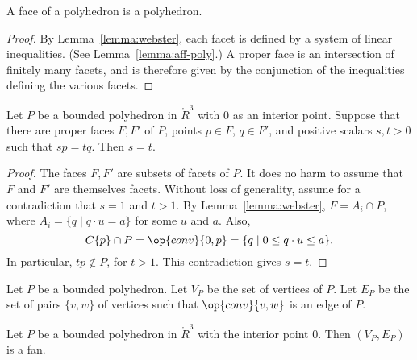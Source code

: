 \begin{corollary}
A face of a polyhedron is a polyhedron.  
\end{corollary}

\begin{proof} By Lemma~\ref{lemma:webster}, each facet is defined by a system of linear inequalities.  (See Lemma~\ref{lemma:aff-poly}.)  A proper face is an intersection of finitely many facets, and is therefore given by the conjunction of the inequalities defining the various facets.
\end{proof}


\begin{lemma} \label{lemma:scale} 
Let $P$ be a bounded polyhedron in $\ring{R}^3$ with $0$ as an interior point.  Suppose that there are proper faces $F,F'$ of $P$, points $p\in F$, $q\in F'$, and positive scalars $s,t >0$ such that $s p = t q$.  Then $s=t$.
\end{lemma}

\begin{proof}  The faces $F,F'$ are subsets of facets of $P$.  It does no harm to assume that $F$ and $F'$ are themselves facets.   Without loss of generality, assume for a contradiction that $s=1$ and $t>1$.  By Lemma~\ref{lemma:webster}, 
 $F = A_i \cap P$, where $A_i = \{q \mid q\cdot u = a\}$ for some $u$ and $a$.  Also, 
$$
C\{p\}\cap P = \op{conv}\{0,p\} = \{q \mid 0\le q\cdot u \le a\}.
$$
In particular, $t p\not\in P$, for $t>1$.  This contradiction gives $s = t$.
\end{proof}





\begin{definition} Let $P$ be a bounded polyhedron.
Let $V_P$ be the set of vertices of $P$.  Let $E_P$ be the set of pairs $\{v,w\}$ of vertices such that $\op{conv}\{v,w\}$ is an edge of $P$.
\end{definition}
%
%

\begin{lemma}\label{lemma:polyhedron}%
Let $P$ be a bounded polyhedron in $\ring{R}^3$ with the interior point $0$.
Then $(V_P,E_P)$ is a fan.
\end{lemma}
%


